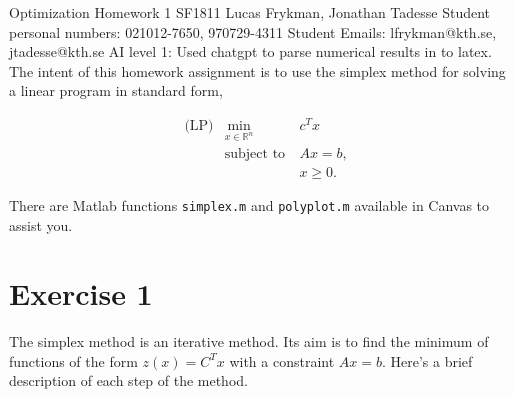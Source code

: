\documentclass{assignment}
\begin{document}
{Optimization}
{Homework 1}
{SF1811}
{Lucas Frykman, Jonathan Tadesse}
{Student personal numbers: 021012-7650, 970729-4311}
{Student Emails: lfrykman@kth.se, jtadesse@kth.se}
AI level 1: Used chatgpt to parse numerical results in to latex. \\

The intent of this homework assignment is to use the simplex method for solving a linear program in standard form,

\begin{align*}
&\text{(LP)} & \min_{x \in \mathbb{R}^n} \ & c^T x \\
& & \text{subject to} \ & Ax = b, \\
& & & x \geq 0.
\end{align*}

There are Matlab functions \texttt{simplex.m} and \texttt{polyplot.m} available in Canvas to assist you.
\section*{Exercise 1}
The simplex method is an iterative method. Its aim is to find the minimum of functions of the form $z(x) = C^Tx$ with a constraint 
$Ax=b$. Here's a brief description of each step of the method.
\end{document}
